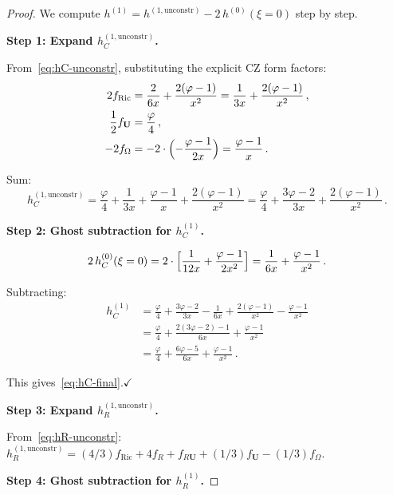 \documentclass[11pt,a4paper]{article}
\theoremstyle{definition}
\theoremstyle{remark}
\begin{document}
\begin{proof}
We compute $h^{(1)} = h^{(1,\mathrm{unconstr})} - 2\,h^{(0)}(\xi=0)$
step by step.

\medskip\noindent
\textbf{Step 1: Expand $h_C^{(1,\mathrm{unconstr})}$.}

From~\eqref{eq:hC-unconstr}, substituting the explicit CZ form factors:
\begin{align*}
  2f_{\mathrm{Ric}} &= \frac{2}{6x} + \frac{2(\varphi-1)}{x^2}
  = \frac{1}{3x} + \frac{2(\varphi-1)}{x^2}\,,\\
  \frac{1}{2}f_{\mathbf{U}} &= \frac{\varphi}{4}\,,\\
  -2f_\Omega &= -2\cdot\Bigl(-\frac{\varphi-1}{2x}\Bigr)
  = \frac{\varphi-1}{x}\,.
\end{align*}

Sum:
\begin{equation}
  h_C^{(1,\mathrm{unconstr})}
  = \frac{\varphi}{4} + \frac{1}{3x} + \frac{\varphi-1}{x}
  + \frac{2(\varphi-1)}{x^2}
  = \frac{\varphi}{4} + \frac{3\varphi - 2}{3x}
  + \frac{2(\varphi-1)}{x^2}\,.
  \label{eq:hC-unconstr-expanded}
\end{equation}

\medskip\noindent
\textbf{Step 2: Ghost subtraction for $h_C^{(1)}$.}

\begin{equation*}
  2\,h_C^{(0)}(\xi=0) = 2\cdot\Bigl[\frac{1}{12x}
  + \frac{\varphi-1}{2x^2}\Bigr]
  = \frac{1}{6x} + \frac{\varphi-1}{x^2}\,.
\end{equation*}

Subtracting:
\begin{align*}
  h_C^{(1)} &= \frac{\varphi}{4}
  + \frac{3\varphi-2}{3x} - \frac{1}{6x}
  + \frac{2(\varphi-1)}{x^2} - \frac{\varphi-1}{x^2}\\
  &= \frac{\varphi}{4}
  + \frac{2(3\varphi-2) - 1}{6x}
  + \frac{\varphi-1}{x^2}\\
  &= \frac{\varphi}{4}
  + \frac{6\varphi - 5}{6x}
  + \frac{\varphi-1}{x^2}\,.
\end{align*}

This gives~\eqref{eq:hC-final}.\quad$\checkmark$

\medskip\noindent
\textbf{Step 3: Expand $h_R^{(1,\mathrm{unconstr})}$.}

From~\eqref{eq:hR-unconstr}:
$h_R^{(1,\mathrm{unconstr})}
= (4/3)f_{\mathrm{Ric}} + 4f_R + f_{R\mathbf{U}}
+ (1/3)f_{\mathbf{U}} - (1/3)f_\Omega$.

\medskip\noindent
\textbf{Step 4: Ghost subtraction for $h_R^{(1)}$.}


\end{proof}
\end{document}
